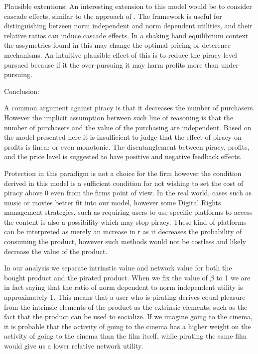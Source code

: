 \documentclass{article}
\begin{document}
Plausible extentions: 
An interesting extension to this model would be to consider cascade effects, similar to the approach of  \cite{N05}. The framework is useful for distinguishing betzeen norm independent and norm dependent utilities, and their relative ratios can induce cascade effects. In a shaking hand equilibrium context the assymetries found in this may change the optimal pricing or deterence mechanisms. An intuitive plausible effect of this is to reduce the  piracy level pursued because if it the over-pursuing it may harm profits more than under-pursuing. 


Conclusion: 

A common argument against piracy is that it decreases the number of purchasers. However the implicit assumption between such line of reasoning is that the number of purchasers and the value of the purchasing are independent. Based on the model presented here it is insufficient to judge that the effect of piracy on profits is linear or even monotonic. The disentanglement between piracy, profits, and the price level is suggested to have positive and negative feedback effects.  

Protection in this paradigm is not a choice for the firm however the condition derived in this model is a sufficient condition for not wishing to set the cost of piracy above 0 even from the firms point of view. In the real world, cases such as music or movies better fit into our model, however some Digital Rights management strategies, such as requiring users to use specific platforms to access the content is also a possibility which may stop piracy. These kind of platforms can be interpreted as merely an increase in r as it decreases the probability of consuming the product, however such methods would not be costless and likely decrease the value of the product.\citep{S04}

In our analysis we separate intrinstic value and network value for both the bought product and the pirated product. When we fix the value of $\beta$ to 1 we are in fact saying that the ratio of norm dependent to norm independent utility is approximately 1. This means that a user who is pirating derives equal pleasure from the intrinsic elements of the product as the extrinsic elements, such as the fact that the product can be used to socialize. If we imagine going to the cinema, it is probable that the activity of going to the cinema has a higher weight on the activity of going to the cinema than the film itself, while pirating the same film would give us a lower relative network utility.
\end{document}
